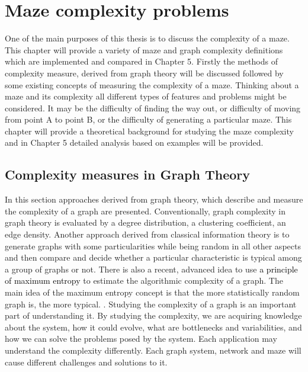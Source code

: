 \chapter{Maze complexity problems}\label{cha:background}
One of the main purposes of this thesis is to discuss the complexity of a maze. This chapter will provide a variety of maze and graph
complexity definitions which are implemented and compared in Chapter 5. Firstly the methods of complexity measure, derived from graph theory will be discussed followed by some existing concepts of measuring the complexity of a maze. Thinking about a maze and its complexity all different types of features and problems might be considered. 
It may be the difficulty of finding the way out, or difficulty of moving from point A to point B, or the difficulty of generating a particular maze. This chapter will provide a theoretical background for studying the maze complexity and in Chapter 5 detailed analysis based on examples will be provided. 
\section{Complexity measures in Graph Theory}
In this section approaches derived from graph theory, which describe and measure the complexity of a graph are presented.
 Conventionally, graph complexity in graph theory is evaluated by a degree distribution, a clustering coefficient, an edge density. Another approach derived from classical information theory is to generate graphs with some particularities while being random in all other aspects and then compare and decide whether a particular characteristic is typical among a group of graphs or not.
There is also a recent, advanced idea to use \textcolor{black}{a principle of maximum entropy} to estimate the algorithmic complexity of a graph. The main idea of the maximum entropy concept is that the more statistically random graph is, the more typical. \cite{11}. 
Studying the complexity of a graph is an important part of understanding it. By studying the complexity, we are acquiring knowledge about the system, how it could evolve, what are bottlenecks and variabilities, and how we can solve the problems posed by the system. Each application may understand the complexity differently. 
Each graph system, network and maze will cause different challenges and solutions to it. 
